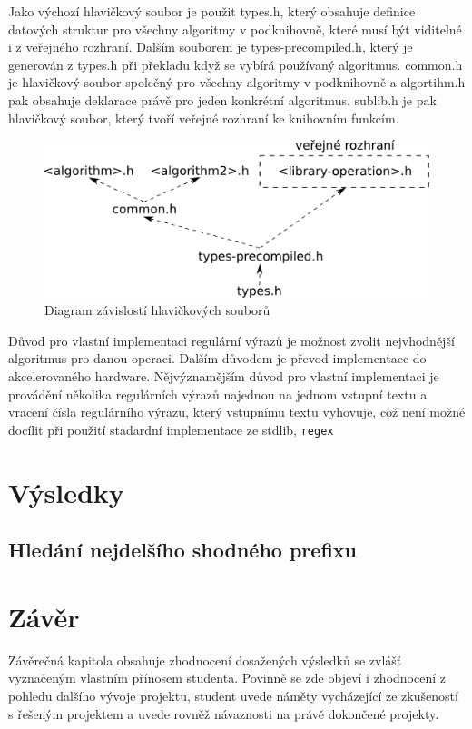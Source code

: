Jako výchozí hlavičkový soubor je použit types.h, který obsahuje definice datových struktur pro všechny algoritmy v podknihovně, které musí být viditelné i z veřejného rozhraní. Dalším souborem je types-precompiled.h, který je generován z types.h při překladu když se vybírá používaný algoritmus. common.h je hlavičkový soubor společný pro všechny algoritmy v podknihovně a algortihm.h pak obsahuje deklarace právě pro jeden konkrétní algoritmus.
sublib.h je pak hlavičkový soubor, který tvoří veřejné rozhraní ke knihovním funkcím.

\begin{figure}[!htb]
\centering
\includegraphics[scale=.25]{fig/header-dependencies.pdf}
\caption{Diagram závislostí hlavičkových souborů}
\label{fig:header-dependecies}
\end{figure}

Důvod pro vlastní implementaci regulární výrazů je možnost zvolit nejvhodnější algoritmus pro danou operaci.
Dalším důvodem je převod implementace do akcelerovaného hardware.
Nějvýznamějším důvod pro vlastní implementaci je provádění několika regulárních výrazů najednou na jednom vstupní textu a vracení čísla regulárního výrazu, který vstupnímu textu vyhovuje, což není možné docílit při použití stadardní implementace ze stdlib, {\tt regex}

\chapter{Výsledky}
\section{Hledání nejdelšího shodného prefixu}

\chapter{Závěr}
Závěrečná kapitola obsahuje zhodnocení dosažených výsledků se zvlášť vyznačeným vlastním přínosem studenta. Povinně se zde objeví i zhodnocení z pohledu dalšího vývoje projektu, student uvede náměty vycházející ze zkušeností s řešeným projektem a uvede rovněž návaznosti na právě dokončené projekty.

